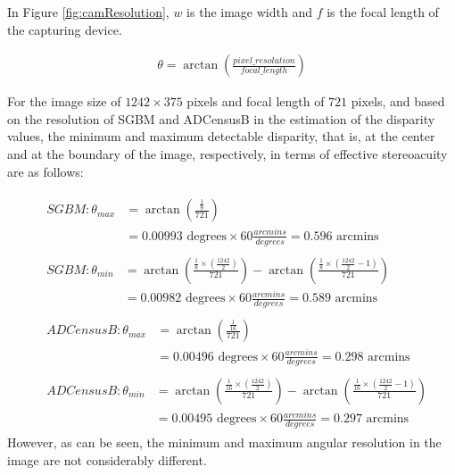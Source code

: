 \noindent
In Figure \ref{fig:camResolution}, $w$ is the image width and $f$ is the focal length of the capturing device.

\begin{align}
\label{eq:algResolution}
\theta = \arctan(\frac{pixel\_resolution}{focal\_length})
\end{align}

For the image size of $1242\times375$ pixels and focal length of $721$ pixels, and based on the resolution of SGBM and ADCensusB in the estimation of the disparity values, 
the minimum and maximum detectable disparity, that is, at the center and at the boundary of the image, respectively, 
in terms of effective stereoacuity are as follows:

\begin{align}
\label{eq:algsgbmresolv} 
&\begin{aligned}
SGBM: \theta_{max} &= \arctan (\frac{\frac{1}{8}}{721}) \\
&= 0.00993 \text{ degrees} \times 60 \frac{arcmins}{degrees} = 0.596 \text{ arcmins}
\end{aligned}\\[2ex]
&\begin{aligned}
SGBM: \theta_{min} &= \arctan (\frac{\frac{1}{8}\times(\frac{1242}{2})}{721}) - \arctan (\frac{\frac{1}{8}\times(\frac{1242}{2}-1)}{721}) \\
&= 0.00982 \text{ degrees} \times 60 \frac{arcmins}{degrees} = 0.589 \text{ arcmins}
\end{aligned}\\[2ex]
&\begin{aligned}
ADCensusB: \theta_{max} &= \arctan (\frac{\frac{1}{16}}{721}) \\
&= 0.00496 \text{ degrees} \times 60 \frac{arcmins}{degrees}= 0.298 \text{ arcmins} 
\label{eq:adcenresolv}
\end{aligned}\\[2ex]
&\begin{aligned}
ADCensusB: \theta_{min} &= \arctan (\frac{\frac{1}{16}\times(\frac{1242}{2})}{721}) - \arctan (\frac{\frac{1}{16}\times(\frac{1242}{2}-1)}{721}) \\
&= 0.00495 \text{ degrees} \times 60 \frac{arcmins}{degrees}= 0.297 \text{ arcmins}
\end{aligned}
\end{align} \newline
\noindent
However, as can be seen, the minimum and maximum angular resolution in the image are not considerably different.

